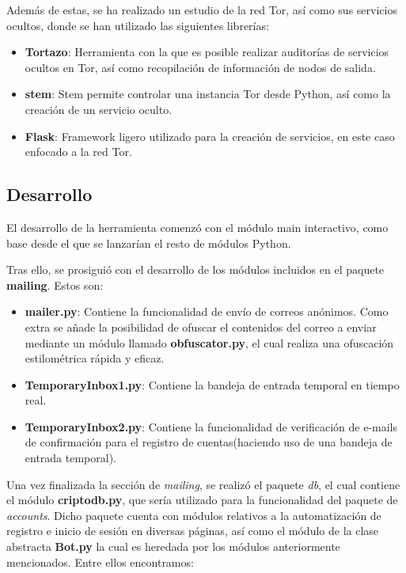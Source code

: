 Además de estas, se ha realizado un estudio de la red Tor, así como sus servicios ocultos, donde se han utilizado las siguientes librerías:
\begin{itemize}
	\item \textbf{Tortazo}: Herramienta con la que es posible realizar auditorías de servicios ocultos en Tor, así como recopilación de información de nodos de salida.
	\item \textbf{stem}: Stem permite controlar una instancia Tor desde Python, así como la creación de un servicio oculto.
	\item \textbf{Flask}: Framework ligero utilizado para la creación de servicios, en este caso enfocado a la red Tor.
\end{itemize}
\subsection{Desarrollo}

El desarrollo de la herramienta comenzó con el módulo main interactivo, como base desde el que se lanzarían el resto de módulos Python.

Tras ello, se prosiguió con el desarrollo de los módulos incluidos en el paquete \textbf{mailing}. Estos son:
\begin{itemize}
	\item \textbf{mailer.py}: Contiene la funcionalidad de envío de correos anónimos. Como extra se añade la posibilidad de ofuscar el contenidos del correo a enviar mediante un módulo llamado \textbf{obfuscator.py}, el cual realiza una ofuscación estilométrica rápida y eficaz.
	\item \textbf{TemporaryInbox1.py}: Contiene la bandeja de entrada temporal en tiempo real.
	\item \textbf{TemporaryInbox2.py}: Contiene la funcionalidad de verificación de e-mails de confirmación para el registro de cuentas(haciendo uso de una bandeja de entrada temporal).
\end{itemize}

Una vez finalizada la sección de \textit{mailing}, se realizó el paquete \textit{db}, el cual contiene el módulo \textbf{criptodb.py}, que sería utilizado para la funcionalidad del paquete de \textit{accounts}.
Dicho paquete cuenta con módulos relativos a la automatización de registro e inicio de sesión en diversas páginas, así como el módulo de la clase abstracta \textbf{Bot.py} la cual es heredada por los módulos anteriormente mencionados. Entre ellos encontramos:

